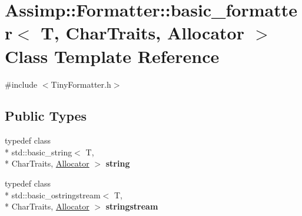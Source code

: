\hypertarget{singleton_assimp_1_1_formatter_1_1basic__formatter}{\section{Assimp\+:\+:Formatter\+:\+:basic\+\_\+formatter$<$ T, Char\+Traits, Allocator $>$ Class Template Reference}
\label{singleton_assimp_1_1_formatter_1_1basic__formatter}
}


{\ttfamily \#include $<$Tiny\+Formatter.\+h$>$}

\subsection*{Public Types}
\begin{DoxyCompactItemize}
\item 
\hypertarget{singleton_assimp_1_1_formatter_1_1basic__formatter_a042b4efff58459458b9243054b9866cd}{typedef class \\*
std\+::basic\+\_\+string$<$ T, \\*
Char\+Traits, \hyperlink{class_allocator}{Allocator} $>$ {\bfseries string}}\label{singleton_assimp_1_1_formatter_1_1basic__formatter_a042b4efff58459458b9243054b9866cd}

\item 
\hypertarget{singleton_assimp_1_1_formatter_1_1basic__formatter_a8a3c7f10d2b611930006a28d10d1d3ed}{typedef class \\*
std\+::basic\+\_\+ostringstream$<$ T, \\*
Char\+Traits, \hyperlink{class_allocator}{Allocator} $>$ {\bfseries stringstream}}\label{singleton_assimp_1_1_formatter_1_1basic__formatter_a8a3c7f10d2b611930006a28d10d1d3ed}

\end{DoxyCompactItemize}
